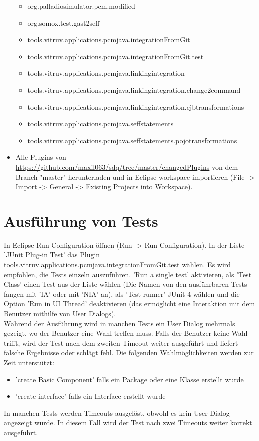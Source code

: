 \begin{itemize}
	\begin{itemize}
	\item org.palladiosimulator.pcm.modified
	\item org.somox.test.gast2seff
	\item tools.vitruv.applications.pcmjava.integrationFromGit
	\item tools.vitruv.applications.pcmjava.integrationFromGit.test
	\item tools.vitruv.applications.pcmjava.linkingintegration
	\item tools.vitruv.applications.pcmjava.linkingintegration.change2command
	\item tools.vitruv.applications.pcmjava.linkingintegration.ejbtransformations
	\item tools.vitruv.applications.pcmjava.seffstatements
	\item tools.vitruv.applications.pcmjava.seffstatements.pojotransformations
	\end{itemize}
\item Alle Plugins von \href{https://github.com/maxil063/sdq/tree/master/changedPlugins}{https://github.com/maxil063/sdq/tree/master/changedPlugins} von dem Branch "master"  herunterladen und in Eclipse workspace importieren (File -> Import -> General -> Existing Projects into Workspace).
\end{itemize}

\section{Ausführung von Tests}
\label{sec:Ausführung von Tests}
In Eclipse Run Configuration öffnen (Run -> Run Configuration). In der Liste 'JUnit Plug-in Test' das Plugin tools.vitruv.applications.pcmjava.integrationFromGit.test wählen. Es wird empfohlen, die Tests einzeln auszuführen. 'Run a single test' aktivieren, als 'Test Class' einen Test aus der Liste wählen (Die Namen von den ausführbaren Tests fangen mit 'IA' oder mit 'NIA' an), als 'Test runner' JUnit 4 wählen und die Option 'Run in UI Thread' deaktivieren (das ermöglicht eine Interaktion mit dem Benutzer mithilfe von User Dialogs).  
\\
Während der Ausführung wird in manchen Tests ein User Dialog mehrmals gezeigt, wo der Benutzer eine Wahl treffen muss. Falls der Benutzer keine Wahl trifft, wird der Test nach dem zweiten Timeout weiter ausgeführt und liefert falsche Ergebnisse oder schlägt fehl. Die folgenden Wahlmöglichkeiten werden zur Zeit unterstützt:
\begin{itemize}
\item 'create Basic Component' falls ein Package oder eine Klasse erstellt wurde
\item 'create interface' falls ein Interface erstellt wurde
\end{itemize}
In manchen Tests werden Timeouts ausgelöst, obwohl es kein User Dialog angezeigt wurde. In diesem Fall wird der Test nach zwei Timeouts weiter korrekt ausgeführt. 
 
